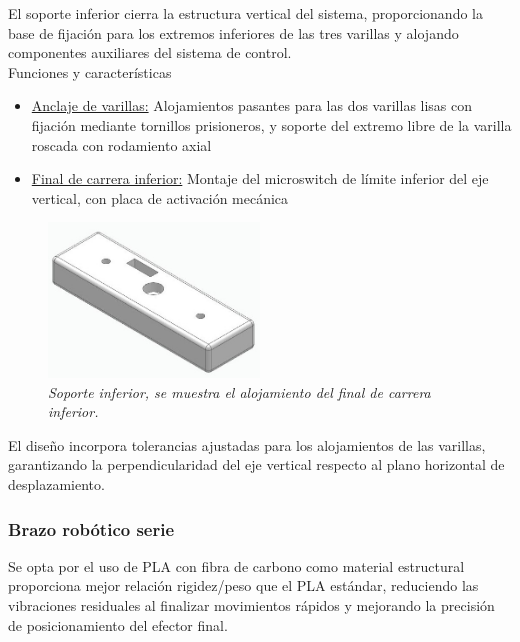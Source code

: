 El soporte inferior cierra la estructura vertical del sistema, proporcionando la base de fijación para los extremos inferiores de las tres varillas y alojando componentes auxiliares del sistema de control.\\

Funciones y características

\begin{itemize}[label=$\bullet$]
    \item \underline{Anclaje de varillas:} Alojamientos pasantes para las dos varillas lisas con fijación mediante tornillos prisioneros, y soporte del extremo libre de la varilla roscada con rodamiento axial
    \item \underline{Final de carrera inferior:} Montaje del microswitch de límite inferior del eje vertical, con placa de activación mecánica
\end{itemize}

\begin{figure}[H]
    \centering
    \includegraphics[width=0.5\textwidth]{img/InferiorReal_simplificado_vista.jpg}
    \caption{\textit{Soporte inferior, se muestra el alojamiento del final de carrera inferior.}}
    \label{fig:soporte_inferior_real}
\end{figure}

El diseño incorpora tolerancias ajustadas para los alojamientos de las varillas, garantizando la perpendicularidad del eje vertical respecto al plano horizontal de desplazamiento.

\subsubsection{Brazo robótico serie}

Se opta por el uso de PLA con fibra de carbono como material estructural proporciona mejor relación rigidez/peso que el PLA estándar, reduciendo las vibraciones residuales al finalizar movimientos rápidos y mejorando la precisión de posicionamiento del efector final.

